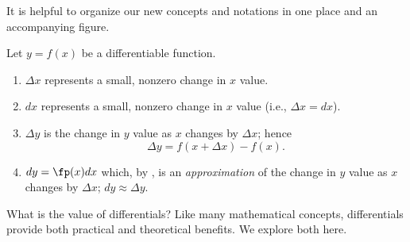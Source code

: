 It is helpful to organize our new concepts and notations in one place and an accompanying figure.


\begin{keyidea}\label{idea:differential}
Let $y = f(x)$ be a differentiable function. 
\begin{enumerate}
	\item $\Delta x$ represents a small, nonzero change in $x$ value.
	\item	$dx$ represents a small, nonzero change in $x$ value (i.e., $\Delta x = dx$).
	\item	$\Delta y$ is the change in $y$ value as $x$ changes by $\Delta x$; hence
	\[\Delta y = f(x+\Delta x)-f(x).\]
	\item		$dy = \fp(x)dx$ which, by , is an \textit{approximation} of the change in $y$ value as $x$ changes by $\Delta x$; $dy \approx \Delta y$.
\end{enumerate}
\end{keyidea}

What is the value of differentials? Like many mathematical concepts, differentials provide both practical and theoretical benefits. We explore both here.\\


